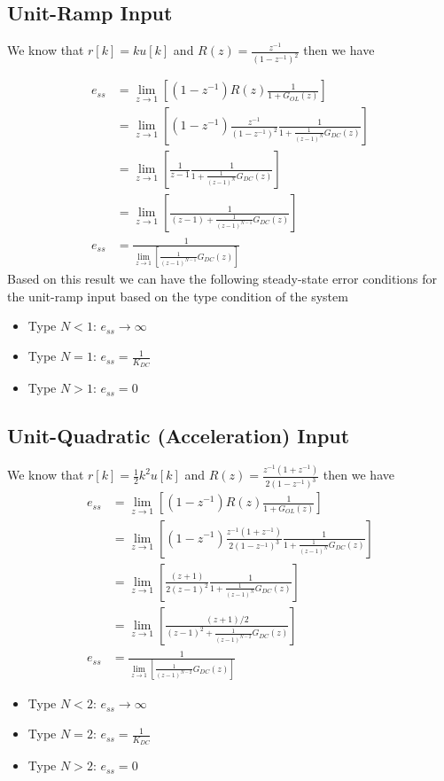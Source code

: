 \documentclass[twoside]{article}
\begin{document}
\subsection*{Unit-Ramp Input}
%
We know that $r[k] = k u[k]$ and $R(z) = \frac{z^{-1}}{(1 - z^{-1})^2}$ then
we have

\begin{align*}
e_{ss} &= \lim_{z \to 1} \left[ \left(1 - z^{-1} \right) R(z) \frac{1}{1
         + G_{OL} (z) } \right]
\\
&= \lim_{z \to 1} \left[ \left(1 - z^{-1} \right) 
  \frac{z^{-1}}{(1 - z^{-1})^2} \frac{1}{1 +\frac{1}{(z-1)^N} G_{DC}(z) } \right]
\\
&= \lim_{z \to 1} \left[ \frac{1}{z - 1} \frac{1}{1 +\frac{1}{(z-1)^N}
  G_{DC}(z) } \right]
\\
&= \lim_{z \to 1} \left[ \frac{1}{(z-1) +\frac{1}{(z-1)^{N-1}}
  G_{DC}(z) } \right]
\\
e_{ss} &=  \frac{1}{ \lim_{z \to 1} \left[ \frac{1}{(z-1)^{N-1}}
  G_{DC}(z) \right] }
\end{align*}
%
Based on this result we can have the following steady-state
error conditions for the unit-ramp input based on the type 
condition of the system
%
\begin{itemize}
\item Type $N < 1$: $e_{ss} \to  \infty$
\item Type $N = 1$: $e_{ss} = \frac{1}{K_{DC}}$
\item Type $N > 1$: $e_{ss} = 0$
\end{itemize}
%
\subsection*{Unit-Quadratic (Acceleration) Input}
%
We know that $r[k] = \frac{1}{2} k^2 u[k]$ and $R(z) = \frac{z^{-1} (1
  + z^{-1})}{2 (1 - z^{-1})^3}$ then
we have
\begin{align*}
e_{ss} &= \lim_{z \to 1} \left[ \left(1 - z^{-1} \right) R(z) \frac{1}{1
         + G_{OL} (z) } \right]
\\
&= \lim_{z \to 1} \left[ \left(1 - z^{-1} \right) 
 \frac{z^{-1} (1 + z^{-1})}{2 (1 - z^{-1})^3} 
  \frac{1}{1 +\frac{1}{(z-1)^N} G_{DC}(z) } \right]
\\
&= \lim_{z \to 1} \left[ \frac{(z+1)}{2 (z - 1)^2} \frac{1}{1 +\frac{1}{(z-1)^N}
  G_{DC}(z) } \right]
\\
&= \lim_{z \to 1} \left[ \frac{(z+1)/2}{(z-1)^2 +\frac{1}{(z-1)^{N-2}}
  G_{DC}(z) } \right]
\\
e_{ss} &=  \frac{1}{ \lim_{z \to 1} \left[ \frac{1}{(z-1)^{N-2}}
  G_{DC}(z) \right] }
\end{align*}
%
\begin{itemize}
\item Type $N < 2$: $e_{ss} \to  \infty$
\item Type $N = 2$: $e_{ss} = \frac{1}{K_{DC}}$
\item Type $N > 2$: $e_{ss} = 0$
\end{itemize}
%
\end{document}
